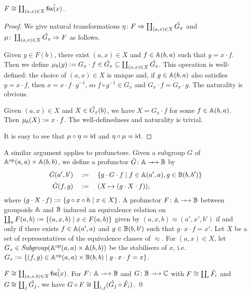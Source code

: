 \begin{proposition}
    \( F \cong \coprod_{(a,x) \in X} \hat{\mathsf{fix}(x)} \).
\end{proposition}
\begin{proof}
    We give natural transformations \( \eta \colon F \Rightarrow \coprod_{(a,x) \in X} \hat{G_x} \) and \( \mu \colon \coprod_{(a,x) \in X} \hat{G_x} \Rightarrow F \) as follows.

    Given \( y \in F(b) \), there exist \( (a,x) \in X \) and \( f \in \mathbb{A}(b,a) \) such that \( y = x \cdot f \).
    Then we define \( \mu_b(y) := G_x \cdot f \in \hat{G_x} \subseteq \coprod_{(a,x) \in X} \hat{G_x} \).
    This operation is well-defined: the choice of \( (a,x) \in X \) is unique and, if \( g \in \mathbb{A}(b,a) \) also satisfies \( y = x \cdot f \), then \( x = x \cdot f \cdot g^{-1} \), so \( f \circ g^{-1} \in G_x \) and \( G_x \cdot f = G_x \cdot g \).
    The naturality is obvious.

    Given \( (a,x) \in X \) and \( X \in \hat{G_x}(b) \), we have \( X = G_x \cdot f \) for some \( f \in \mathbb{A}(b,a) \).
    Then \( \mu_b(X) := x \cdot f \).
    The well-definedness and naturality is trivial.

    It is easy to see that \( \mu \circ \eta = \mathrm{id} \) and \( \eta \circ \mu = \mathrm{id} \).
\end{proof}

A similar argument applies to profunctors.
Given a subgroup \( G \) of \( \mathbb{A}^{\mathrm{op}}(a,a) \times \mathbb{A}(b,b) \), we define a profunctor \( \InducedProf{G} \colon \Grp \profarrow \Grpb \) by 
\begin{align*}
    \hat{G}(a', b')
    &\quad:=\quad
    \{ g \cdot G \cdot f \mid f \in \mathbb{A}(a', a), g \in \mathbb{B}(b, b') \}
    \\
    \hat{G}(f, g)
    &\quad:=\quad
    (X \mapsto (g \cdot X \cdot f)),
\end{align*}
where \( (g \cdot X \cdot f) := \{ g \circ x \circ h \mid x \in X \} \).
A profunctor \( F \colon \Grp \profarrow \Grpb \) between groupoids \( \mathbb{A} \) and \( \mathbb{B} \) induced an equivalence relation on \( \coprod_a F(a,b) := \{ (a, x, b) \mid x \in F(a, b) \} \) given by
\( (a, x, b) \approx (a', x', b') \) if and only if there exists \( f \in \mathbb{A}(a', a) \) and \( g \in \mathbb{B}(b, b') \) such that \( g \cdot x \cdot f = x' \).
Let \( X \) be a set of representatives of the equivalence classes of \( \approx \).
For \( (a, x) \in X \), let \( G_x \in \mathit{Subgroup}(\mathbb{A}^{\mathrm{op}}(a,a) \times \mathbb{A}(b,b)) \) be the stabilisers of \( x \), i.e.~\( G_x := \{ (f,g) \in \mathbb{A}^{\mathrm{op}}(a,a) \times \mathbb{B}(b,b) \mid g \cdot x \cdot f = x \} \).

\begin{proposition}
    \( F \cong \coprod_{(a,x,b) \in X} \hat{\mathsf{fix}(x)} \).
    For \( F \colon \Grp \profarrow \Grpb \) and \( G \colon \Grpb \profarrow \Grpc \) with \( F \cong \coprod_i \hat{F_i} \) and \( G \cong \coprod_j \hat{G_j} \), we have \( G \circ F \cong \coprod_{i,j} (\hat{G_j} \circ \hat{F_i}) \).
    \qed
\end{proposition}
